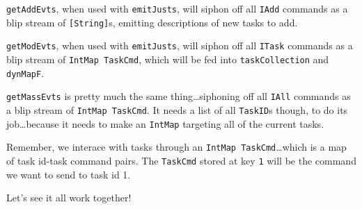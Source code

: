 \documentclass[]{article}
\begin{document}
\texttt{getAddEvts}, when used with \texttt{emitJusts}, will siphon off all
\texttt{IAdd} commands as a blip stream of \texttt{{[}String{]}}s, emitting
descriptions of new tasks to add.

\texttt{getModEvts}, when used with \texttt{emitJusts}, will siphon off all
\texttt{ITask} commands as a blip stream of \texttt{IntMap\ TaskCmd}, which will
be fed into \texttt{taskCollection} and \texttt{dynMapF}.

\texttt{getMassEvts} is pretty much the same thing\ldots{}siphoning off all
\texttt{IAll} commands as a blip stream of \texttt{IntMap\ TaskCmd}. It needs a
list of all \texttt{TaskID}s though, to do its job\ldots{}because it needs to
make an \texttt{IntMap} targeting all of the current tasks.

Remember, we interace with tasks through an
\texttt{IntMap\ TaskCmd}\ldots{}which is a map of task id-task command pairs.
The \texttt{TaskCmd} stored at key \texttt{1} will be the command we want to
send to task id 1.

Let's see it all work together!
\end{document}
